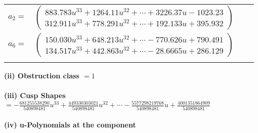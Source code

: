 \documentclass[1p]{elsarticle_modified}
\theoremstyle{definition}
\begin{document}
\begin{tabular}{m{7pt} m{180pt} m{7pt} m{180pt} }
\flushright $a_{2}=$&$\begin{pmatrix}883.783 u^{33}+1264.11 u^{32}+\cdots+3226.37 u-1023.23\\312.911 u^{33}+778.291 u^{32}+\cdots+192.133 u+395.932\end{pmatrix}$ \\
\flushright $a_{6}=$&$\begin{pmatrix}150.030 u^{33}+648.213 u^{32}+\cdots-770.626 u+790.491\\134.517 u^{33}+442.863 u^{32}+\cdots-28.6665 u+286.129\end{pmatrix}$\\&\end{tabular}
\flushleft \textbf{(ii) Obstruction class $= 1$}\\~\\
\flushleft \textbf{(iii) Cusp Shapes $= -\frac{681255538290}{540898481} u^{33}+\frac{449330303021}{540898481} u^{32}+\cdots-\frac{5577298219768}{540898481} u+\frac{4001351864909}{540898481}$}\\~\\
\newpage\renewcommand{\arraystretch}{1}
\flushleft \textbf{(iv) u-Polynomials at the component}\newline \\
\end{document}
